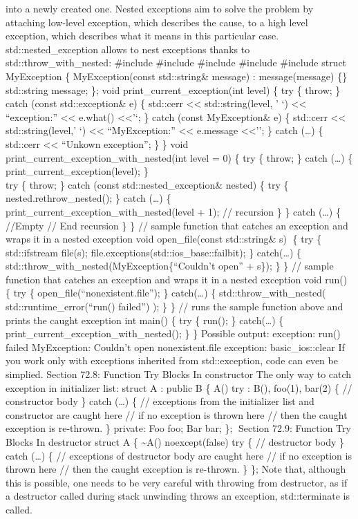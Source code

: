 into a newly created one. Nested exceptions aim to solve the problem by
attaching low-level exception, which describes the cause, to a high
level exception, which describes what it means in this particular case.
std::nested\_exception allows to nest exceptions thanks to
std::throw\_with\_nested: \#include \#include \#include \#include
\#include struct MyException \{ MyException(const std::string\& message)
: message(message) \{\} std::string message; \}; void
print\_current\_exception(int level) \{ try \{ throw; \} catch (const
std::exception\& e) \{ std::cerr \textless\textless{} std::string(level,
' `) \textless\textless{} ``exception:'' \textless\textless{} e.what()
\textless\textless{}'\n`; \} catch (const MyException\& e) \{ std::cerr
\textless\textless{} std::string(level,' `) \textless\textless{}
``MyException:'' \textless\textless{} e.message
\textless\textless{}'\n'; \} catch (\ldots) \{ std::cerr
\textless\textless{} ``Unkown exception\n''; \} \} void
print\_current\_exception\_with\_nested(int level = 0) \{ try \{ throw;
\} catch (\ldots) \{ print\_current\_exception(level); \}\\
try \{ throw; \} catch (const std::nested\_exception\& nested) \{ try \{
nested.rethrow\_nested(); \} catch (\ldots) \{
print\_current\_exception\_with\_nested(level + 1); // recursion \} \}
catch (\ldots) \{ //Empty // End recursion \} \} // sample function that
catches an exception and wraps it in a nested exception void
open\_file(const std::string\& s) \{ try \{ std::ifstream file(s);
file.exceptions(std::ios\_base::failbit); \} catch(\ldots) \{
std::throw\_with\_nested(MyException\{``Couldn't open'' + s\}); \} \} //
sample function that catches an exception and wraps it in a nested
exception void run() \{ try \{ open\_file(``nonexistent.file''); \}
catch(\ldots) \{ std::throw\_with\_nested( std::runtime\_error(``run()
failed'') ); \} \} // runs the sample function above and prints the
caught exception int main() \{ try \{ run(); \} catch(\ldots) \{
print\_current\_exception\_with\_nested(); \} \} Possible output:
exception: run() failed MyException: Couldn't open nonexistent.file
exception: basic\_ios::clear If you work only with exceptions inherited
from std::exception, code can even be simplied. Section 72.8: Function
Try Blocks In constructor The only way to catch exception in initializer
list: struct A : public B \{ A() try : B(), foo(1), bar(2) \{ //
constructor body \} catch (\ldots) \{ // exceptions from the initializer
list and constructor are caught here // if no exception is thrown here
// then the caught exception is re-thrown. \} private: Foo foo; Bar bar;
\}; Section 72.9: Function Try Blocks In destructor struct A \{
\textasciitilde A() noexcept(false) try \{ // destructor body \} catch
(\ldots) \{ // exceptions of destructor body are caught here // if no
exception is thrown here // then the caught exception is re-thrown. \}
\}; Note that, although this is possible, one needs to be very careful
with throwing from destructor, as if a destructor called during stack
unwinding throws an exception, std::terminate is called.

